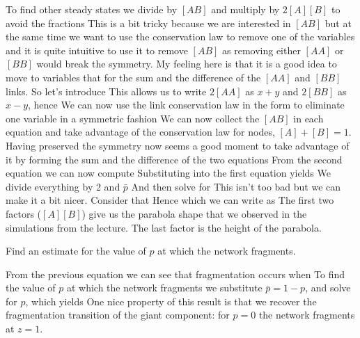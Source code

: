 To find other steady states we divide by $[AB]$ and multiply by $2[A][B]$ to avoid the fractions
This is a bit tricky because we are interested in $[AB]$ but at the same time we want to use the conservation law to remove one of the variables and it is quite intuitive to use it to remove $[AB]$ as removing either $[AA]$ or $[BB]$ would break the symmetry. My feeling here is that it is a good idea to move to variables that for the sum and the difference of the $[AA]$ and $[BB]$ links. So let's introduce
This allows us to write $2[AA]$ as $x+y$ and $2[BB]$ as $x-y$, hence
We can now use the link conservation law in the form 
to eliminate one variable in a symmetric fashion
We can now collect the $[AB]$ in each equation and take advantage of the conservation law for nodes, $[A]+[B]=1$.
Having preserved the symmetry now seems a good moment to take advantage of it by forming the sum and the difference of the two equations
From the second equation we can now compute 
Substituting into the first equation yields
We divide everything by 2 and $\bar{p}$ 
And then solve for 
This isn't too bad but we can make it a bit nicer. Consider that 
Hence
which we can write as 
The first two factors ($[A][B]$) give us the parabola shape that we observed in the simulations from the lecture. The last factor is the height of the parabola. 

\subquestion
Find an estimate for the value of $p$ at which the network fragments.

\solution
From the previous equation we can see that fragmentation occurs when 
To find the value of $p$ at which the network fragments we substitute $\bar{p}=1-p$,
and solve for $p$, which yields
One nice property of this result is that we recover the fragmentation transition of the giant component: for $p=0$ the network fragments at $z=1$.